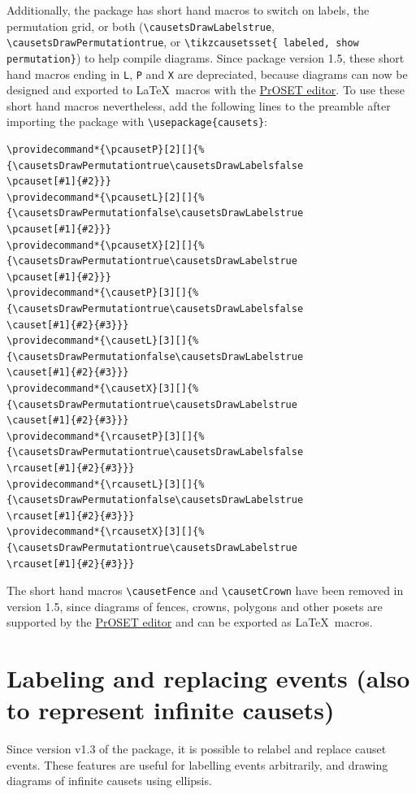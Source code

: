\documentclass[12pt]{article}
\begin{document}
Additionally, the package has short hand macros to switch on labels, the permutation grid, or both (\lstinline&\causetsDrawLabelstrue&, \lstinline&\causetsDrawPermutationtrue&, or \lstinline&\tikzcausetsset{ labeled, show permutation}&) to help compile diagrams.
Since package version 1.5, these short hand macros ending in \lstinline&L&, \lstinline&P& and \lstinline&X& are depreciated, because diagrams can now be designed and exported to \LaTeX\ macros with the \href{https://c-minz.github.io/assets/html/proset-editor.html}{PrOSET editor}.
To use these short hand macros nevertheless, add the following lines to the preamble after importing the package with \lstinline&\usepackage{causets}&:
\begin{lstlisting}
\providecommand*{\pcausetP}[2][]{%
{\causetsDrawPermutationtrue\causetsDrawLabelsfalse
\pcauset[#1]{#2}}}
\providecommand*{\pcausetL}[2][]{%
{\causetsDrawPermutationfalse\causetsDrawLabelstrue
\pcauset[#1]{#2}}}
\providecommand*{\pcausetX}[2][]{%
{\causetsDrawPermutationtrue\causetsDrawLabelstrue
\pcauset[#1]{#2}}}
\providecommand*{\causetP}[3][]{%
{\causetsDrawPermutationtrue\causetsDrawLabelsfalse
\causet[#1]{#2}{#3}}}
\providecommand*{\causetL}[3][]{%
{\causetsDrawPermutationfalse\causetsDrawLabelstrue
\causet[#1]{#2}{#3}}}
\providecommand*{\causetX}[3][]{%
{\causetsDrawPermutationtrue\causetsDrawLabelstrue
\causet[#1]{#2}{#3}}}
\providecommand*{\rcausetP}[3][]{%
{\causetsDrawPermutationtrue\causetsDrawLabelsfalse
\rcauset[#1]{#2}{#3}}}
\providecommand*{\rcausetL}[3][]{%
{\causetsDrawPermutationfalse\causetsDrawLabelstrue
\rcauset[#1]{#2}{#3}}}
\providecommand*{\rcausetX}[3][]{%
{\causetsDrawPermutationtrue\causetsDrawLabelstrue
\rcauset[#1]{#2}{#3}}}
\end{lstlisting}

The short hand macros \lstinline&\causetFence& and \lstinline&\causetCrown& have been removed in version 1.5, since diagrams of fences, crowns, polygons and other posets are supported by the \href{https://c-minz.github.io/assets/html/proset-editor.html}{PrOSET editor} and can be exported as \LaTeX\ macros.


\section{Labeling and replacing events (also to represent infinite causets)}
\label{sec:LabelingReplacing}

Since version v1.3 of the package, it is possible to relabel and replace causet events.
These features are useful for labelling events arbitrarily, and drawing diagrams of infinite causets using ellipsis.
\end{document}
